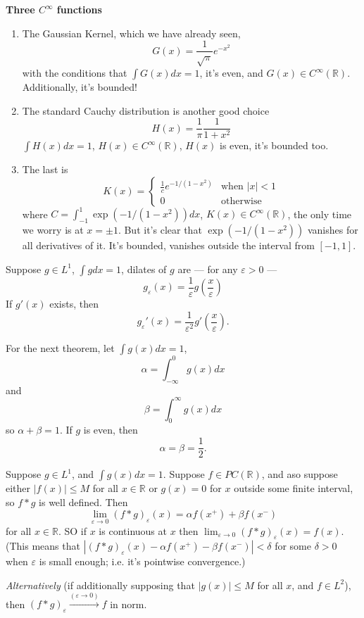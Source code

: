 \textbf{Three $C^\infty$ functions}
\begin{enumerate}
\item The Gaussian Kernel, which we have already seen,
\begin{equation}
G(x) = \frac{1}{\sqrt{\pi}}e^{-x^2}
\end{equation}
with the conditions that $\int G(x)dx=1$, it's even, and
$G(x)\in C^{\infty}(\mathbb{R})$. Additionally, it's bounded!
\item The standard Cauchy distribution is another good
  choice
\begin{equation}
H(x) = \frac{1}{\pi}\frac{1}{1+x^2}
\end{equation}
$\int H(x)dx=1$, $H(x)\in C^{\infty}(\mathbb{R})$, $H(x)$ is
even, it's bounded too.
\item The last is
\begin{equation}
K(x) = \begin{cases} \frac{1}{c}e^{-1/(1-x^2)} &\text{when }|x|<1\\
0&\text{otherwise}\end{cases}
\end{equation}
where $C=\int^{1}_{-1}\exp(-1/(1-x^2))dx$, $K(x)\in
C^{\infty}(\mathbb{R})$, the only time we worry is at
$x=\pm1$. But it's clear that $\exp(-1/(1-x^2))$ vanishes
for all derivatives of it. It's bounded, vanishes outside
the interval from $[-1,1]$.
\end{enumerate}

Suppose $g\in L^1$, $\int gdx=1$, dilates of $g$ are --- for
any $\varepsilon>0$ ---
\begin{equation}
g_{\varepsilon}(x) =
\frac{1}{\varepsilon}g\left(\frac{x}{\varepsilon}\right)
\end{equation}
If $g'(x)$ exists, then
\begin{equation}
g_{\varepsilon}'(x) =
\frac{1}{\varepsilon^2}g'\left(\frac{x}{\varepsilon}\right).
\end{equation}

For the next theorem, let $\int g(x)dx=1$, 
$$\alpha = \int^{0}_{-\infty}g(x)dx$$
and
$$\beta = \int^{\infty}_{0}g(x)dx$$
so $\alpha+\beta=1$. If $g$ is even, then
$$\alpha=\beta=\frac{1}{2}.$$
\begin{thm}\label{thm:12May2008:thmUsedInInverseFourierTransform}
Suppose $g\in L^1$, and $\int g(x)dx=1$. Suppose $f\in
PC(\mathbb{R})$, and aso suppose either $|f(x)|\leq M$ for
all $x\in\mathbb{R}$ or $g(x)=0$ for $x$ outside some finite
interval, so $f*g$ is well defined. Then
\begin{equation}
\lim_{\varepsilon\to0}(f*g)_{\varepsilon}(x) = \alpha
f(x^+)+\beta f(x^-)
\end{equation}
for all $x\in\mathbb{R}$. SO if $x$ is continuous at $x$
then
$\lim_{\varepsilon\to0}(f*g)_{\varepsilon}(x)=f(x)$. (This
means that $|(f*g)_{\varepsilon}(x)-\alpha f(x^+)-\beta
f(x^-)|<\delta$ for some $\delta>0$ when $\varepsilon$ is
small enough; i.e. it's pointwise convergence.)

\emph{Alternatively} (if additionally supposing that
$|g(x)|\leq M$ for all $x$, and $f\in L^2$), then
$(f*g)_{\varepsilon}\stackrel{(\varepsilon\to0)}{\longrightarrow}f$
in norm.
\end{thm}
